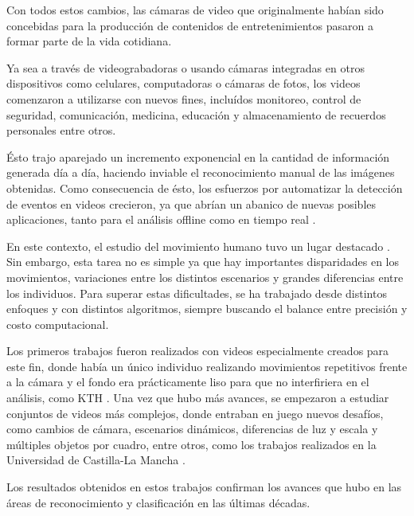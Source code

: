 Con todos estos cambios, las cámaras de video que originalmente habían sido concebidas para la producción de contenidos de entretenimientos pasaron a
formar parte de la vida cotidiana.

Ya sea a través de videograbadoras o usando cámaras integradas en otros dispositivos como celulares, computadoras o cámaras de fotos, los videos
comenzaron a utilizarse con nuevos fines, incluídos monitoreo, control de seguridad, comunicación, medicina,  educación y almacenamiento de recuerdos
personales entre otros.

Ésto trajo aparejado un incremento exponencial en la cantidad de información generada día a día, haciendo inviable el reconocimiento manual de las
imágenes obtenidas. Como consecuencia de ésto, los esfuerzos por automatizar la detección de eventos en videos crecieron, ya que abrían un abanico
de nuevas posibles aplicaciones, tanto para el análisis offline como en tiempo real \parencite{whiten2013mofreak}.

En este contexto, el estudio del movimiento humano tuvo un lugar destacado \parencite{poppe2010survey}. Sin embargo, esta tarea no es simple ya que hay
importantes disparidades en los movimientos, variaciones entre los distintos escenarios y grandes diferencias entre los individuos. Para superar estas
dificultades, se ha trabajado desde distintos enfoques y con distintos algoritmos, siempre buscando el balance entre precisión y costo computacional.

Los primeros trabajos fueron realizados con videos especialmente creados para este fin, donde había un único individuo realizando movimientos repetitivos
frente a la cámara y el fondo era prácticamente liso para que no interfiriera en el análisis, como KTH \parencite{schuldt2004recognizing}. Una vez que hubo
más avances, se empezaron a estudiar conjuntos de videos más complejos, donde entraban en juego nuevos desafíos, como cambios de cámara, escenarios
dinámicos, diferencias de luz y escala y múltiples objetos por cuadro, entre otros, como los trabajos realizados en la Universidad de Castilla-La
Mancha \parencite{nievas2011violence, deniz2014fast}.

Los resultados obtenidos en estos trabajos confirman los avances que hubo en las áreas de reconocimiento y clasificación en las últimas décadas.





\iffalse
Un método común y que ha resultado ser eficiente para obtener información a partir de imágenes es la utilización de descriptores.
Estos descriptores informan acerca de las características visuales de la imagen, describiendo características elementales como la forma, el color,
la textura y la ubicación de elementos dentro de la misma.
Para extender esta idea al plano de los videos, lo que se hace es desglosar el video en las imágenes que lo componen (frames), para luego analizar por separado
cada una de ellas. Con esta información ya disponible se incorpora el factor temporal, siendo éste el eje en la relación entre los distintos frames, permitiendo,
por ejemplo, analizar variaciones de un frame a otro.
\fi
